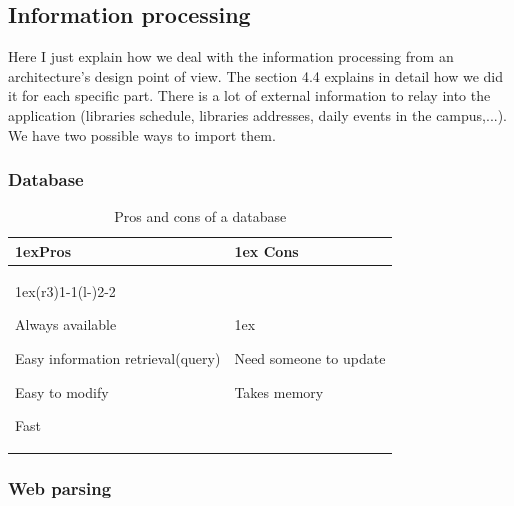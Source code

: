 \documentclass{eplmastersthesis}
\begin{document}
\subsection{Information processing}

Here I just explain how we deal with the information processing from an architecture's design point of view. The section 4.4 explains in detail how we did it for each specific part.
There is a lot of external information to relay into the application (libraries schedule, libraries addresses, daily events in the campus,...). We have two possible ways to import them.

\subsubsection{Database}

\begin{table}[H]
\begin{tabularx}{\linewidth}{>{\parskip1ex}X@{\kern4\tabcolsep}>{\parskip1ex}X}
\toprule
\hfil\bfseries Pros
&
\hfil\bfseries Cons
\\\cmidrule(r{3\tabcolsep}){1-1}\cmidrule(l{-\tabcolsep}){2-2}

Always available\par
Easy information retrieval(query)\par
Easy to modify\par
Fast\par

&

Need someone to update\par
Takes memory \par


\\\bottomrule
\end{tabularx}
\caption{Pros and cons of a database}
\end{table}

\subsubsection{Web parsing}
\end{document}
